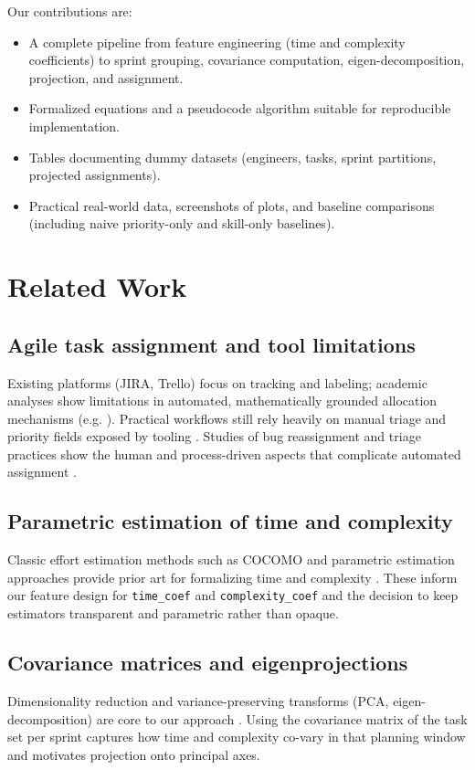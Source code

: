 \documentclass[journal]{IEEEtran}
\begin{document}
Our contributions are:
\begin{itemize}[leftmargin=*]
    \item A complete pipeline from feature engineering (time and complexity coefficients) to sprint grouping, covariance computation, eigen-decomposition, projection, and assignment.
    \item Formalized equations and a pseudocode algorithm suitable for reproducible implementation.
    \item Tables documenting dummy datasets (engineers, tasks, sprint partitions, projected assignments).
    \item Practical real-world data, screenshots of plots, and baseline comparisons (including naive priority-only and skill-only baselines).
\end{itemize}

\section{Related Work}\label{sec:related}
\subsection{Agile task assignment and tool limitations}
Existing platforms (JIRA, Trello) focus on tracking and labeling; academic analyses show limitations in automated, mathematically grounded allocation mechanisms (e.g. \cite{jira_assignment}). Practical workflows still rely heavily on manual triage and priority fields exposed by tooling \cite{atlassian_priorities}. Studies of bug reassignment and triage practices show the human and process-driven aspects that complicate automated assignment \cite{guo2011notmybug,xuan2017bugtriage}.

\subsection{Parametric estimation of time and complexity}
Classic effort estimation methods such as COCOMO and parametric estimation approaches provide prior art for formalizing time and complexity \cite{cocomo, parametric_estimate}. These inform our feature design for \texttt{time\_coef} and \texttt{complexity\_coef} and the decision to keep estimators transparent and parametric rather than opaque.

\subsection{Covariance matrices and eigenprojections}
Dimensionality reduction and variance-preserving transforms (PCA, eigen-decomposition) are core to our approach \cite{pca2017, eigen_projection}. Using the covariance matrix of the task set per sprint captures how time and complexity co-vary in that planning window and motivates projection onto principal axes.
\end{document}
